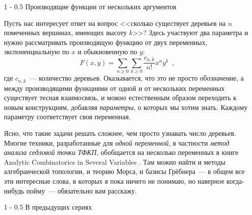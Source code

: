 \documentclass[a5paper]{article}
\makeatletter
\theoremstyle{definition}
\renewcommand{\section}{\@startsection
{section}%
{1}%
{\z@}%
{-\baselineskip}%
{0.5\baselineskip}%
{\centering\large\scshape}} %
\renewcommand{\subsection}{\@startsection
{subsection}%
{1}%
{\z@}%
{-\baselineskip}%
{0.5\baselineskip}%
{\centering\large\scshape}} %
\makeatother
\begin{document}
\subsection{Производящие функции от нескольких аргументов}

Пусть нас интересует ответ на вопрос <<сколько существует деревьев на \( n \) 
помеченных вершинах, имеющих высоту \( k \)>>? Здесь участвуют два параметра и 
нужно рассматривать производящую функцию от двух переменных, экспоненциальную 
по \( x \) и обыкновенную по \( y \):
\[
	F(x, y) = \sum_{n \geq 0} \sum_{k \geq 0} \dfrac{c_{n,k}}{n!} x^n y^k 
	\enspace ,
\]
где \( c_{n,k} \)~--- количество деревьев. Оказывается, что это не просто 
обозначение, а между производящими функциями от одной и от нескольких 
переменных существует тесная взаимосвязь, и можно естественным образом 
переходить к новым конструкциям, добавляя \textit{параметры}, о которых мы 
хотим знать. Каждому параметру соответствует своя переменная.

Ясно, что такие задачи решать сложнее, чем просто узнавать число деревьев. 
Многие техники, разработанные для \textit{одной переменной}, в частности 
\textit{метод анализа седловой точки ТФКП}, обобщается на несколько переменных 
в книге Analytic Combinatorics in Several Variables \cite{acsv}. Там можно 
найти и методы алгебраической топологии, и 
теорию Морса, и базисы Грёбнера~--- в общем все эти интересные слова, в которых 
я пока ничего не понимаю, но наверное когда-нибудь пойму~--- обязательно вам 
расскажу.

\section{В предыдущих сериях}
\end{document}
